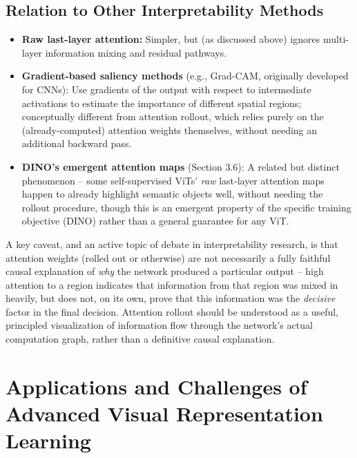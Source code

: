 \documentclass[12pt,a4paper]{article}
\begin{document}
\subsection{Relation to Other Interpretability Methods}

\begin{itemize}[leftmargin=1.5em]
    \item \textbf{Raw last-layer attention:} Simpler, but (as discussed above) ignores multi-layer information mixing and residual pathways.
    \item \textbf{Gradient-based saliency methods} (e.g., Grad-CAM, originally developed for CNNs): Use gradients of the output with respect to intermediate activations to estimate the importance of different spatial regions; conceptually different from attention rollout, which relies purely on the (already-computed) attention weights themselves, without needing an additional backward pass.
    \item \textbf{DINO's emergent attention maps} (Section 3.6): A related but distinct phenomenon -- some self-supervised ViTs' \emph{raw} last-layer attention maps happen to already highlight semantic objects well, without needing the rollout procedure, though this is an emergent property of the specific training objective (DINO) rather than a general guarantee for any ViT.
\end{itemize}

\begin{keyidea}
A key caveat, and an active topic of debate in interpretability research, is that attention weights (rolled out or otherwise) are not necessarily a fully faithful causal explanation of \emph{why} the network produced a particular output -- high attention to a region indicates that information from that region was mixed in heavily, but does not, on its own, prove that this information was the \emph{decisive} factor in the final decision. Attention rollout should be understood as a useful, principled visualization of information flow through the network's actual computation graph, rather than a definitive causal explanation.
\end{keyidea}

\newpage

\section{Applications and Challenges of Advanced Visual Representation Learning}
\end{document}
